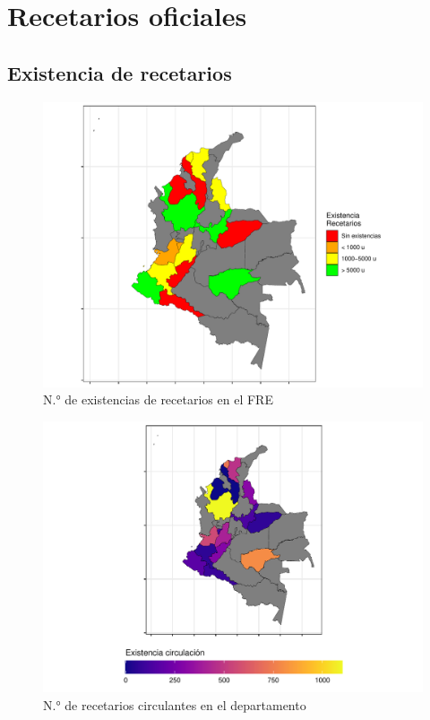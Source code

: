 \documentclass[
]{book}
\begin{document}
\hypertarget{recetarios-oficiales}{%
\chapter{Recetarios oficiales}\label{recetarios-oficiales}}


\hypertarget{existencia-de-recetarios}{%
\section{Existencia de recetarios}\label{existencia-de-recetarios}}

\begin{figure}
\includegraphics[width=0.85\linewidth]{InformeFinal_files/figure-latex/existenciasRecetarios-1} \caption{N.° de existencias de recetarios en el FRE}\label{fig:existenciasRecetarios}
\end{figure}

\begin{figure}
\includegraphics[width=0.85\linewidth]{InformeFinal_files/figure-latex/existenciasRecetarios2-1} \caption{N.° de recetarios circulantes en el departamento}\label{fig:existenciasRecetarios2}
\end{figure}
\end{document}
